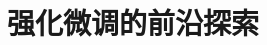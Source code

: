 \setcounter{chapter}{20}

\hypertarget{ux5f3aux5316ux5faeux8c03ux7684ux524dux6cbfux63a2ux7d22}{%
\chapter{强化微调的前沿探索}\label{ux5f3aux5316ux5faeux8c03ux7684ux524dux6cbfux63a2ux7d22}}
